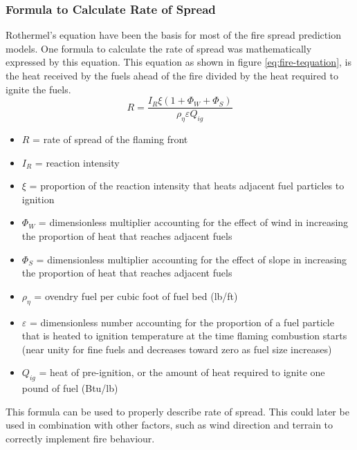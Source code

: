 \subsubsection{Formula to Calculate Rate of Spread}
Rothermel’s equation have been the basis for most of the fire spread prediction models. One formula to calculate the rate of spread was mathematically expressed by this equation. This equation as shown in figure \ref{eq:fire-tequation}, is the heat received by the fuels ahead of the fire divided by the heat required to ignite the fuels.
\begin{equation}
R=\dfrac{I_R \xi(1 + \Phi_W + \Phi_S)}{\rho _{\eta} \varepsilon  Q_{ig}}
\label{eq:fire-tequation}
\end{equation}
\begin{itemize}
\item $ R $ = rate of spread of the flaming front
\item $I_R$ = reaction intensity
\item $\xi$ = proportion of the reaction intensity that heats adjacent fuel particles to ignition
\item $\Phi_W$ = dimensionless multiplier accounting for the effect of wind in increasing the proportion of heat that reaches adjacent fuels
\item $\Phi_S$ = dimensionless multiplier accounting for the effect of slope in increasing the proportion of heat that reaches adjacent fuels
\item $\rho _{\eta}$ = ovendry fuel per cubic foot of fuel bed (lb/ft)
\item $\varepsilon$ = dimensionless number accounting for the proportion of a fuel particle that is heated to ignition temperature at the time flaming combustion starts (near unity for fine fuels and decreases toward zero as fuel size increases)
\item $Q_{ig}$ = heat of pre-ignition, or the amount of heat required to ignite one pound of fuel (Btu/lb)
\end{itemize}
This formula can be used to properly describe rate of spread. This could later be used in combination with other factors, such as wind direction and terrain to correctly implement fire behaviour.
